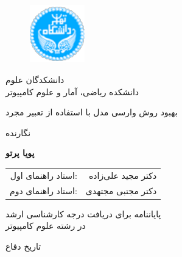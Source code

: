 \documentclass[12pt]{report}
\begin{document}

\begin{figure}
\centering
\includegraphics[height=2.5cm]{UT-Logo.pdf}
\end{figure}

\begin{center}
دانشکدگان علوم
\\
دانشکده ریاضی، آمار و علوم کامپیوتر
\end{center}

\begin{center}
\end{center}

\begin{center}
\huge{بهبود روش وارسی مدل با استفاده از تعبیر مجرد}
\end{center}

\begin{center}
\end{center}

\begin{center}
نگارنده
\end{center}
\begin{center}
\textbf{
پویا پرتو
}
\end{center}

\begin{center}
\begin{tabular}{rr}
استاد راهنمای اول:& دکتر مجید علی‌زاده
\\
استاد راهنمای دوم: & دکتر مجتبی مجتهدی
\\

\end{tabular}
\end{center}

\vspace{3cm}
\begin{center}
پایاننامه برای دریافت درجه کارشناسی ارشد
\\
در رشته علوم کامپیوتر
\end{center}

\begin{center}
تاریخ دفاع
\end{center}

\pagestyle{empty}
\pagenumbering{}
\end{document}
